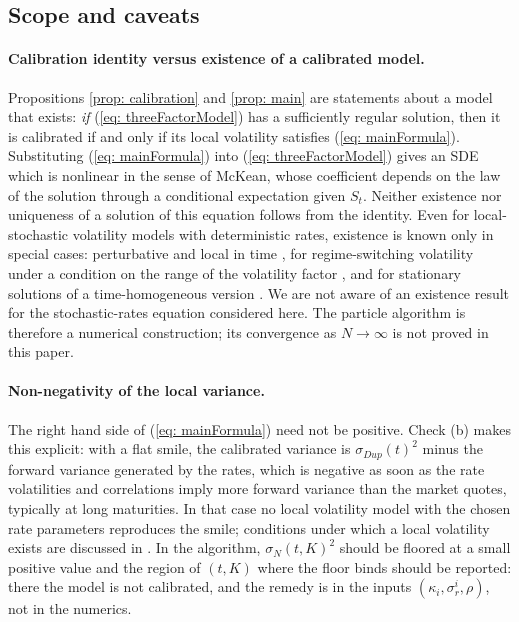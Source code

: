 \subsection{Scope and caveats}\label{subsec: caveats}

\paragraph{Calibration identity versus existence of a calibrated model.} Propositions \ref{prop: calibration} and \ref{prop: main} are statements about a model that exists: \emph{if} (\ref{eq: threeFactorModel}) has a sufficiently regular solution, then it is calibrated if and only if its local volatility satisfies (\ref{eq: mainFormula}). Substituting (\ref{eq: mainFormula}) into (\ref{eq: threeFactorModel}) gives an SDE which is nonlinear in the sense of McKean, whose coefficient depends on the law of the solution through a conditional expectation given $S_t$. Neither existence nor uniqueness of a solution of this equation follows from the identity. Even for local-stochastic volatility models with deterministic rates, existence is known only in special cases: perturbative and local in time \cite{abergelTachet}, for regime-switching volatility under a condition on the range of the volatility factor \cite{jourdainZhou}, and for stationary solutions of a time-homogeneous version \cite{lackerShkolnikovZhang}. We are not aware of an existence result for the stochastic-rates equation considered here. The particle algorithm is therefore a numerical construction; its convergence as $N\to\infty$ is not proved in this paper.

\paragraph{Non-negativity of the local variance.} The right hand side of (\ref{eq: mainFormula}) need not be positive. Check (b) makes this explicit: with a flat smile, the calibrated variance is $\sigma_{Dup}(t)^2$ minus the forward variance generated by the rates, which is negative as soon as the rate volatilities and correlations imply more forward variance than the market quotes, typically at long maturities. In that case no local volatility model with the chosen rate parameters reproduces the smile; conditions under which a local volatility exists are discussed in \cite{ogetbilGanesanHientzsch}. In the algorithm, $\sigma_N(t,K)^2$ should be floored at a small positive value and the region of $(t,K)$ where the floor binds should be reported: there the model is not calibrated, and the remedy is in the inputs $(\kappa_i,\sigma^i_r,\rho)$, not in the numerics.

